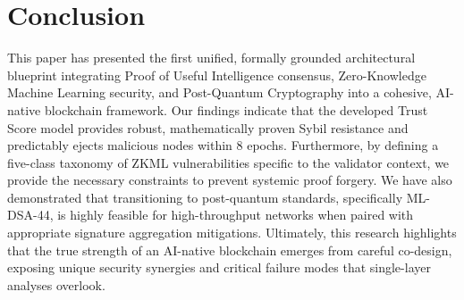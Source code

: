 \documentclass[journal]{IEEEtran}
\begin{document}
\section{Conclusion}
\label{sec:conclusion}

This paper has presented the first unified, formally grounded architectural blueprint integrating Proof of Useful Intelligence consensus, Zero-Knowledge Machine Learning security, and Post-Quantum Cryptography into a cohesive, AI-native blockchain framework. Our findings indicate that the developed Trust Score model provides robust, mathematically proven Sybil resistance and predictably ejects malicious nodes within 8 epochs. Furthermore, by defining a five-class taxonomy of ZKML vulnerabilities specific to the validator context, we provide the necessary constraints to prevent systemic proof forgery. We have also demonstrated that transitioning to post-quantum standards, specifically ML-DSA-44, is highly feasible for high-throughput networks when paired with appropriate signature aggregation mitigations. Ultimately, this research highlights that the true strength of an AI-native blockchain emerges from careful co-design, exposing unique security synergies and critical failure modes that single-layer analyses overlook. 



\end{document}
